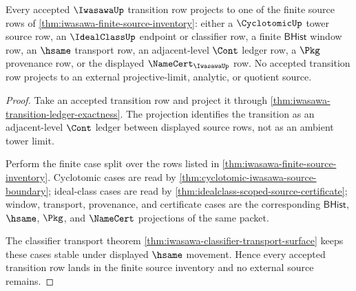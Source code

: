 \begin{theorem}
\label{thm:iwasawa-transition-source-coverage}
Every accepted $\IwasawaUp$ transition row projects to one of the finite source
rows of \autoref{thm:iwasawa-finite-source-inventory}: either a
$\CyclotomicUp$ tower source row, an $\IdealClassUp$ endpoint or classifier
row, a finite $\mathsf{BHist}$ window row, an $\hsame$ transport row, an
adjacent-level $\Cont$ ledger row, a $\Pkg$ provenance row, or the displayed
$\NameCert_{\IwasawaUp}$ row. No accepted transition row projects to an
external projective-limit, analytic, or quotient source.
\end{theorem}
\begin{proof}
Take an accepted transition row and project it through
\autoref{thm:iwasawa-transition-ledger-exactness}. The projection identifies
the transition as an adjacent-level $\Cont$ ledger between displayed source
rows, not as an ambient tower limit.

Perform the finite case split over the rows listed in
\autoref{thm:iwasawa-finite-source-inventory}. Cyclotomic cases are read by
\autoref{thm:cyclotomic-iwasawa-source-boundary}; ideal-class cases are read by
\autoref{thm:idealclass-scoped-source-certificate}; window, transport,
provenance, and certificate cases are the corresponding $\mathsf{BHist}$,
$\hsame$, $\Pkg$, and $\NameCert$ projections of the same packet.

The classifier transport theorem
\autoref{thm:iwasawa-classifier-transport-surface} keeps these cases stable
under displayed $\hsame$ movement. Hence every accepted transition row lands in
the finite source inventory and no external source remains.
\end{proof}

